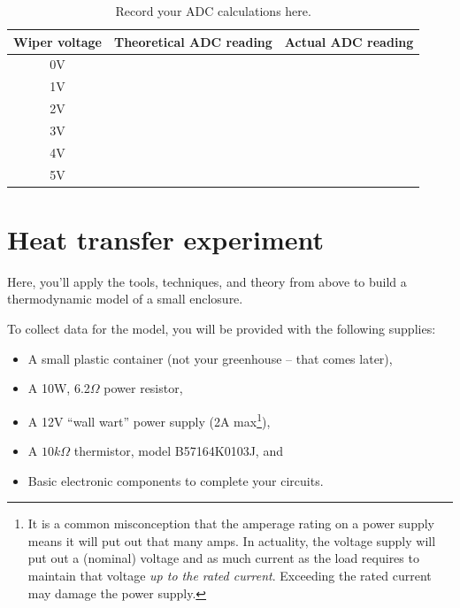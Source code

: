 \documentclass[11pt]{article} %
\begin{document}
\begin{table}[h]
\centering
\begin{tabular}{c|c|c}
\hline
Wiper voltage & Theoretical ADC reading & Actual ADC reading \\
\hline\hline
0V&&\\
\hline
1V&&\\
\hline
2V&&\\
\hline
3V&&\\
\hline
4V&&\\
\hline
5V&&\\
\hline
\end{tabular}
\caption{Record your ADC calculations here.}
\label{tab:adc}
\end{table}


\section*{Heat transfer experiment}

Here, you’ll apply the tools, techniques, and theory from above to build a thermodynamic model of a small enclosure.

To collect data for the model, you will be provided with the following supplies:
\begin{itemize}
\item A small plastic container (not your greenhouse -- that comes later),
\item A 10W, 6.2$\Omega$ power resistor,
\item A 12V “wall wart” power supply (2A max\footnote{It is a common misconception that the amperage rating on a power supply means it will put out that many amps. In actuality, the voltage supply will put out a (nominal) voltage and as much current as the load requires to maintain that voltage \emph{up to the rated current}. Exceeding the rated current may damage the power supply.}),
\item A $10k\Omega$ thermistor, model B57164K0103J, and
\item Basic electronic components to complete your circuits.
\end{itemize}
\end{document}
